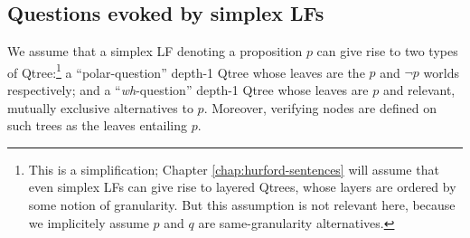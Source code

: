 \begin{exe}
	\label{ex2:qtree-reduction}
\end{exe}




\subsection{Questions evoked by simplex LFs}\label{sec:simplex}
We assume that a simplex LF denoting a proposition $p$ can give rise to two types of Qtree:\footnote{This is a simplification; Chapter \ref{chap:hurford-sentences} will assume that even simplex LFs can give rise to layered Qtrees, whose layers are ordered by some notion of granularity. But this assumption is not relevant here, because we implicitely assume $p$ and $q$ are same-granularity alternatives.} a ``polar-question'' depth-1 Qtree whose leaves are the $p$ and $\neg p$ worlds respectively; and a ``\textit{wh}-question'' depth-1 Qtree whose leaves are $p$ and relevant, mutually exclusive alternatives to $p$. Moreover, verifying nodes are defined on such trees as the leaves entailing $p$.

